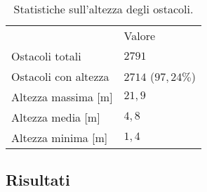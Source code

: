 %
\begin{table}[htbp]
	\centering
	  \begin{tabular}{| L{.4\linewidth} | C{.2\linewidth} |}
			\toprule
																	&		Valore 								\\
			\thickerline
			Ostacoli totali							&		$2791$							\\ \hline
			Ostacoli con altezza				&		$2714$ ($97,24\%$)		\\ \hline
			Altezza massima	[m]					&		$21,9$								\\ \hline
			Altezza media	[m]						&		$4,8$									\\ \hline
			Altezza minima [m]					&		$1,4$									\\
			\bottomrule
	  \end{tabular}
	\caption{Statistiche sull'altezza degli ostacoli.\label{tab:simulazioni-sensori-altezze-edfici}}
\end{table}
%
\subsection{Risultati}\label{sec:configurazione-sensori-risultati}


%
